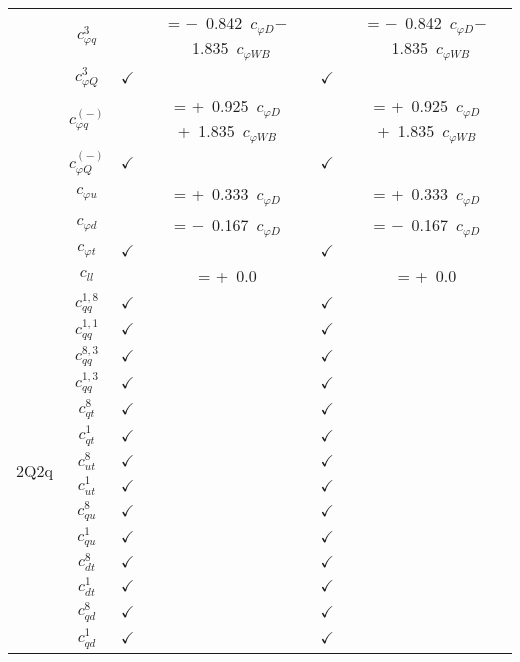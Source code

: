 \documentclass{article}
\begin{document}
\begin{table}[H]
\begin{tabular}{|c|c|c|c|c|c|}
 & $c_{\varphi q}^{3}$ & & = $-$\ 0.842\ $c_{\varphi D}$$-$\ 1.835\ $c_{\varphi WB}$ & & = $-$\ 0.842\ $c_{\varphi D}$$-$\ 1.835\ $c_{\varphi WB}$\\ \cline{2-6}
 & $c_{\varphi Q}^{3}$ & $\checkmark$ &  & $\checkmark$ & \\ \cline{2-6}
 & $c_{\varphi q}^{(-)}$ & & = +\ 0.925\ $c_{\varphi D}$+\ 1.835\ $c_{\varphi WB}$ & & = +\ 0.925\ $c_{\varphi D}$+\ 1.835\ $c_{\varphi WB}$\\ \cline{2-6}
 & $c_{\varphi Q}^{(-)}$ & $\checkmark$ &  & $\checkmark$ & \\ \cline{2-6}
 & $c_{\varphi u}$ & & = +\ 0.333\ $c_{\varphi D}$ & & = +\ 0.333\ $c_{\varphi D}$\\ \cline{2-6}
 & $c_{\varphi d}$ & & = $-$\ 0.167\ $c_{\varphi D}$ & & = $-$\ 0.167\ $c_{\varphi D}$\\ \cline{2-6}
 & $c_{\varphi t}$ & $\checkmark$ &  & $\checkmark$ & \\ \cline{2-6}
 & $c_{ll}$ & & = +\ 0.0 & & = +\ 0.0
\\ \hline
\multirow{14}{*}{2Q2q}
 & $c_{qq}^{1,8}$ & $\checkmark$ &  & $\checkmark$ & \\ \cline{2-6}
 & $c_{qq}^{1,1}$ & $\checkmark$ &  & $\checkmark$ & \\ \cline{2-6}
 & $c_{qq}^{8,3}$ & $\checkmark$ &  & $\checkmark$ & \\ \cline{2-6}
 & $c_{qq}^{1,3}$ & $\checkmark$ &  & $\checkmark$ & \\ \cline{2-6}
 & $c_{qt}^{8}$ & $\checkmark$ &  & $\checkmark$ & \\ \cline{2-6}
 & $c_{qt}^{1}$ & $\checkmark$ &  & $\checkmark$ & \\ \cline{2-6}
 & $c_{ut}^{8}$ & $\checkmark$ &  & $\checkmark$ & \\ \cline{2-6}
 & $c_{ut}^{1}$ & $\checkmark$ &  & $\checkmark$ & \\ \cline{2-6}
 & $c_{qu}^{8}$ & $\checkmark$ &  & $\checkmark$ & \\ \cline{2-6}
 & $c_{qu}^{1}$ & $\checkmark$ &  & $\checkmark$ & \\ \cline{2-6}
 & $c_{dt}^{8}$ & $\checkmark$ &  & $\checkmark$ & \\ \cline{2-6}
 & $c_{dt}^{1}$ & $\checkmark$ &  & $\checkmark$ & \\ \cline{2-6}
 & $c_{qd}^{8}$ & $\checkmark$ &  & $\checkmark$ & \\ \cline{2-6}
 & $c_{qd}^{1}$ & $\checkmark$ &  & $\checkmark$ &
\\ \hline

\end{tabular}
\end{table}
\end{document}

